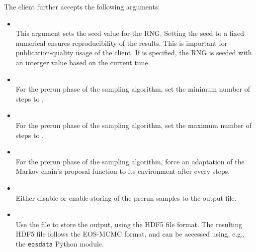 The  client further accepts the following arguments:
\begin{itemize}
    \item[] \\[\medskipamount]
        This argument sets the seed value for the \gls{RNG}. Setting the
        seed to a fixed numerical  ensures reproducibility of the results. This
        is important for publication-quality usage of the client. If  is
        specified, the \gls{RNG} is seeded with an interger value based on the current time.

    \item[] \\[\medskipamount]
        For the prerun phase of the sampling algorithm, set the minimum number of
        steps to .

    \item[] \\[\medskipamount]
        For the prerun phase of the sampling algorithm, set the maximum number of
        steps to .

    \item[] \\[\medskipamount]
        For the prerun phase of the sampling algorithm, force an adaptation of the
        Markov chain's proposal function to its environment after every 
        steps.

    \item[] \\[\medskipamount]
        Either disable or enable storing of the prerun samples to the output file.\\

    \item[] \\[\medskipamount]
        Use the file  to store the output, using the \gls{HDF5} file format.
        The resulting \gls{HDF5} file follows the EOS-\gls{MCMC} format, and can be accessed using, e.g.,
        the \texttt{eosdata} Python module.
\end{itemize}

